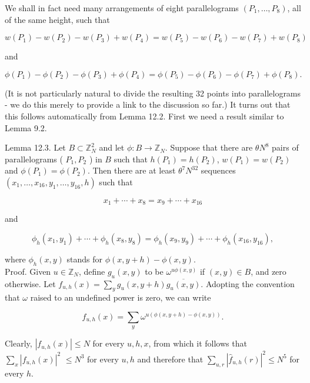 \documentclass[10pt]{article}
\begin{document}
We shall in fact need many arrangements of eight parallelograms $\left(P_{1}, \ldots, P_{8}\right)$, all of the same height, such that

$$
w\left(P_{1}\right)-w\left(P_{2}\right)-w\left(P_{3}\right)+w\left(P_{4}\right)=w\left(P_{5}\right)-w\left(P_{6}\right)-w\left(P_{7}\right)+w\left(P_{8}\right)
$$

and

$$
\phi\left(P_{1}\right)-\phi\left(P_{2}\right)-\phi\left(P_{3}\right)+\phi\left(P_{4}\right)=\phi\left(P_{5}\right)-\phi\left(P_{6}\right)-\phi\left(P_{7}\right)+\phi\left(P_{8}\right) .
$$

(It is not particularly natural to divide the resulting 32 points into parallelograms - we do this merely to provide a link to the discussion so far.) It turns out that this follows automatically from Lemma 12.2. First we need a result similar to Lemma 9.2.

Lemma 12.3. Let $B \subset \mathbb{Z}_{N}^{2}$ and let $\phi: B \rightarrow \mathbb{Z}_{N}$. Suppose that there are $\theta N^{8}$ pairs of parallelograms ( $P_{1}, P_{2}$ ) in $B$ such that $h\left(P_{1}\right)=h\left(P_{2}\right)$, $w\left(P_{1}\right)=w\left(P_{2}\right)$ and $\phi\left(P_{1}\right)=\phi\left(P_{2}\right)$. Then there are at least $\theta^{7} N^{32}$ sequences $\left(x_{1}, \ldots, x_{16}, y_{1}, \ldots, y_{16}, h\right)$ such that

$$
x_{1}+\cdots+x_{8}=x_{9}+\cdots+x_{16}
$$

and

$$
\phi_{h}\left(x_{1}, y_{1}\right)+\cdots+\phi_{h}\left(x_{8}, y_{8}\right)=\phi_{h}\left(x_{9}, y_{9}\right)+\cdots+\phi_{h}\left(x_{16}, y_{16}\right),
$$

where $\phi_{h}(x, y)$ stands for $\phi(x, y+h)-\phi(x, y)$.\\
Proof. Given $u \in \mathbb{Z}_{N}$, define $g_{u}(x, y)$ to be $\omega^{u \phi(x, y)}$ if $(x, y) \in B$, and zero otherwise. Let $f_{u, h}(x)=\sum_{y} g_{u}(x, y+h) \overline{g_{u}(x, y)}$. Adopting the convention that $\omega$ raised to an undefined power is zero, we can write

$$
f_{u, h}(x)=\sum_{y} \omega^{u(\phi(x, y+h)-\phi(x, y))} .
$$

Clearly, $\left|f_{u, h}(x)\right| \leqslant N$ for every $u, h, x$, from which it follows that $\sum_{x}\left|f_{u, h}(x)\right|^{2}$ $\leqslant N^{3}$ for every $u, h$ and therefore that $\sum_{u, r}\left|\hat{f}_{u, h}(r)\right|^{2} \leqslant N^{5}$ for every $h$.
\end{document}
